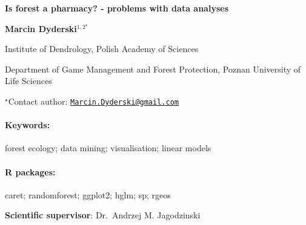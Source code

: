 \documentclass[11pt, a4paper]{article}
\renewcommand{\title}[1]{\begin{center}{\bf \LARGE #1}\end{center}}
\newcommand{\keywords}{\paragraph{Keywords:}}
\newcommand{\packages}{\paragraph{R packages:}}
\begin{document}
\pagestyle{empty}

\title{Is forest a pharmacy? - problems with data analyses}

\begin{center}
  {\bf Marcin Dyderski$^{1, 2^\star}$}
\end{center}

\vskip 0.3cm

\begin{affiliations}
\begin{enumerate}
\begin{minipage}{0.915\textwidth}
\centering
\item Institute of Dendrology, Polish Academy of Sciences \\[-2pt]
\item Department of Game Management and Forest Protection, Poznan University
of Life Sciences \\[-2pt]
\end{minipage}
\end{enumerate}
$^\star$Contact author: \href{mailto:Marcin.Dyderski@gmail.com}{\nolinkurl{Marcin.Dyderski@gmail.com}}\\
\end{affiliations}

\vskip 0.5cm

\begin{minipage}{0.915\textwidth}
\keywords forest ecology; data mining; visualisation; linear models
\packages caret; randomforest; ggplot2; hglm; sp; rgeos
\end{minipage}

\vskip 0.8cm

\textbf{Scientific supervisor}: Dr.~Andrzej M. Jagodzinski
\end{document}
